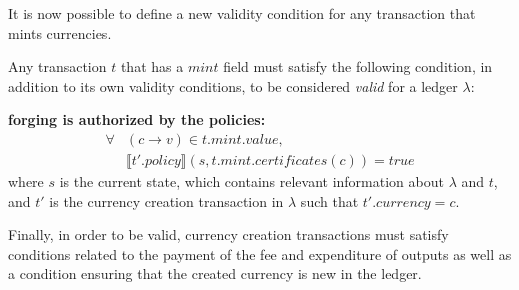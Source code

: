 \documentclass{llncs}
\newcommand{\field}[1]{\mathit{#1}}
\newcommand{\mint}{\field{mint}}
\newcommand{\val}{\field{value}}
\newcommand{\policy}{\field{policy}}
\newcommand{\certificates}{\field{certificates}}
\newcommand{\currency}{\field{currency}}
\newcommand{\true}{\field{true}}
\newcommand{\interpret}[1]{\llbracket #1 \rrbracket}
\newenvironment{smallish}{
	\begin{small}
}{
	\end{small}
}
\begin{document}
It is now possible to define a new validity condition for any transaction that mints currencies.

\begin{definition}
\label{def:Valid-Mint}
Any transaction $t$ that has a $\mint$ field must satisfy the following condition, in addition to its own validity conditions, to be considered \emph{valid} for a ledger $\lambda$:

\begin{smallish}
\textbf{forging is authorized by the policies:}
\begin{equation*}
\begin{split}
\forall &(c \rightarrow v) \in t.\mint.\val,\\& \interpret{t'.\policy}(s, t.\mint.\certificates(c)) = \true
\end{split}
\end{equation*}
where $s$ is the current state, which contains relevant information about $\lambda$ and $t$, and $t'$ is the currency creation transaction in $\lambda$ such that $t'.\currency = c$.
\end{smallish}
\end{definition}

Finally, in order to be valid, currency creation transactions must satisfy conditions related to the payment of the fee and expenditure of outputs as well as a condition ensuring that the created currency is new in the ledger.
\end{document}
